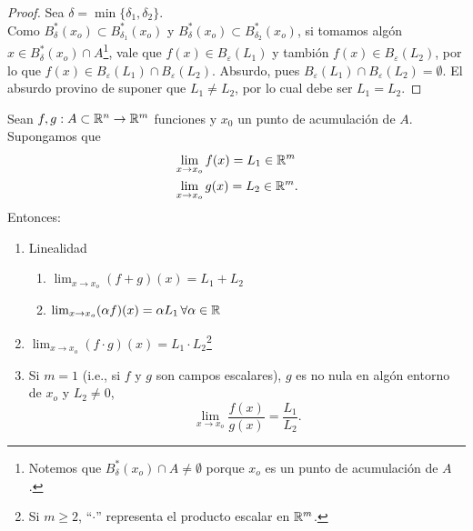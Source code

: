 \begin{theorem}
\begin{proof}
 Sea $\delta = \min\{ \delta_1, \delta_2 \}$. \\
 Como $B_{\delta}^*(x_o) \subset B_{\delta_1}^*(x_o)$ y $B_{\delta}^*(x_o) \subset B_{\delta_2}^*(x_o)$, si tomamos alg\'on $x \in B_{\delta}^*(x_o) \cap A$\footnote{Notemos que $B_{\delta}^*(x_o) \cap A \ne \emptyset$ porque $x_o$ es un punto de acumulaci\'on de $A$.}, vale que $f(x) \in B_{\varepsilon}(L_1)$ y tambi\'on $f(x) \in B_{\varepsilon}(L_2)$, por lo que $f(x) \in B_{\varepsilon}(L_1) \cap B_{\varepsilon}(L_2)$. Absurdo, pues $B_{\varepsilon}(L_1) \cap B_{\varepsilon}(L_2) = \emptyset$. El absurdo provino de suponer que $L_1 \ne L_2$, por lo cual debe ser $L_1 = L_2$.

\end{proof}

\end{theorem}
\begin{propertie} \label{prop:alg_lim} Sean $f,g:A \subset \mathbb{R}^n \to \mathbb{R}^m$ funciones y $x_0$ un punto de acumulaci\'on de $A$. Supongamos que 
  \begin{align*}
   &\lim_{x \to x_o} f(x) = L_1 \in \mathbb{R}^m \\
   &\lim_{x \to x_o} g(x) = L_2 \in \mathbb{R}^m.
  \end{align*}
  Entonces:
  \begin{enumerate} %
   \item Linealidad
      \begin{enumerate} %
       \item $\lim_{x \to x_o} (f + g)(x) = L_1 + L_2$
       \item $\lim_{x \to x_o} (\alpha f)(x) = \alpha L_1 \, \forall \alpha \in \mathbb{R}$
      \end{enumerate}
  \item $\lim_{x \to x_o} (f \cdot g) (x) = L_1 \cdot L_2$\footnote{Si $m \ge 2$, ``$\cdot$'' representa el producto escalar en $\mathbb{R}^m$.}
  \item Si $m = 1$ (i.e., si $f \text{ y } g$ son campos escalares), $g$ es no nula en alg\'on entorno de $x_o$ y $L_2 \ne 0$, 
  \[
   \lim_{x \to x_o} \frac{f(x)}{g(x)} = \frac{L_1}{L_2}.
  \]
  \end{enumerate}
\end{propertie}

